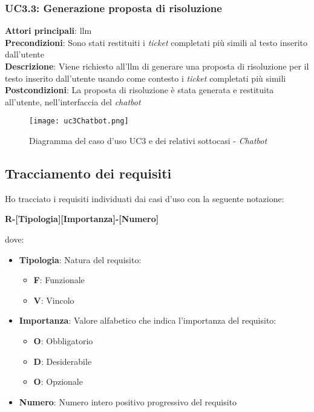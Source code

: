 \subsubsection{UC3.3: Generazione proposta di risoluzione}
\textbf{Attori principali}: \gls{llm} \\
\textbf{Precondizioni}: Sono stati restituiti i \textit{ticket} completati più simili al testo inserito dall'utente \\
\textbf{Descrizione}: Viene richiesto all'\gls{llm} di generare una proposta di risoluzione per il testo inserito dall'utente usando come contesto i \textit{ticket} completati più simili \\
\textbf{Postcondizioni}: La proposta di risoluzione è stata generata e restituita all'utente, nell'interfaccia del \textit{chatbot} \\


\begin{figure}[H]
    \centering
    \texttt{[image: uc3Chatbot.png]}
    \caption{Diagramma del caso d'uso UC3 e dei relativi sottocasi - \textit{Chatbot}}
    \label{fig:UC3Chatbot}
\end{figure}

\subsection{Tracciamento dei requisiti}
Ho tracciato i requisiti individuati dai casi d'uso con la seguente notazione:
\begin{center}
    \textbf{R-[Tipologia][Importanza]-[Numero]}
\end{center}
dove: 
\begin{itemize}
    \item \textbf{Tipologia}: Natura del requisito: \begin{itemize}
        \item \textbf{F}: Funzionale
        \item \textbf{V}: Vincolo
    \end{itemize}
    \item \textbf{Importanza}: Valore alfabetico che indica l'importanza del requisito: \begin{itemize}
        \item \textbf{O}: Obbligatorio
        \item \textbf{D}: Desiderabile
        \item \textbf{O}: Opzionale
    \end{itemize}
    \item \textbf{Numero}: Numero intero positivo progressivo del requisito
\end{itemize}

